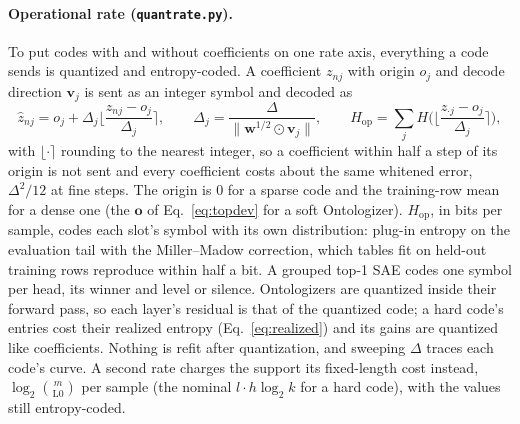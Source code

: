 \paragraph{Operational rate (\texttt{quantrate.py}).} To put codes with
and without coefficients on one rate axis, everything a code sends is
quantized and entropy-coded. A coefficient $z_{nj}$ with origin $o_j$ and
decode direction $\mathbf{v}_j$ is sent as an integer symbol and decoded
as
\begin{equation}
	\hat z_{nj} = o_j + \Delta_j \Big\lfloor \frac{z_{nj} - o_j}{\Delta_j} \Big\rceil,
	\qquad
	\Delta_j = \frac{\Delta}{\lVert \mathbf{w}^{1/2} \odot \mathbf{v}_j \rVert},
	\qquad
	H_{\mathrm{op}} = \sum_j H\Big(\Big\lfloor \frac{z_{\cdot j} - o_j}{\Delta_j} \Big\rceil\Big),
	\label{eq:quantrate}
\end{equation}
with $\lfloor\cdot\rceil$ rounding to the nearest integer, so a coefficient
within half a step of its origin is not sent and every coefficient costs
about the same whitened error, $\Delta^2/12$ at fine steps. The origin is
0 for a sparse code and the training-row mean for a dense one (the
$\mathbf{o}$ of Eq.~\eqref{eq:topdev} for a soft Ontologizer).
$H_{\mathrm{op}}$, in bits per sample, codes each slot's symbol with its
own distribution: plug-in entropy on the evaluation tail with the
Miller--Madow correction, which tables fit on held-out training rows
reproduce within half a bit. A grouped top-1 SAE codes one symbol per
head, its winner and level or silence. Ontologizers are quantized inside
their forward pass, so each layer's residual is that of the quantized
code; a hard code's entries cost their realized entropy
(Eq.~\eqref{eq:realized}) and its gains are quantized like coefficients.
Nothing is refit after quantization, and sweeping $\Delta$ traces each
code's curve. A second rate charges the support its fixed-length cost
instead, $\log_2\binom{m}{\mathrm{L0}}$ per sample (the nominal
$l\cdot h\log_2 k$ for a hard code), with the values still entropy-coded.

